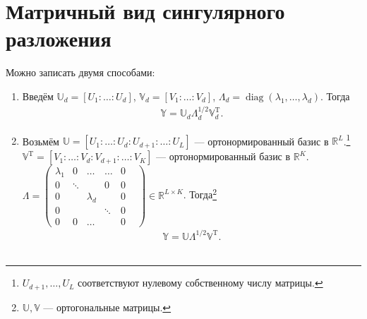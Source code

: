 \documentclass[specialist, 12pt,
subf, %
href, colorlinks=true,
substylefile = spbu.rtx,
]{disser}
\DeclareMathOperator{\diag}{diag}
\begin{document}
\section{Матричный вид сингулярного разложения}
Можно записать двумя способами:
\begin{enumerate}
	\item Введём $\mathbb{U}_d = [U_1: \ldots: U_d]$, $\mathbb{V}_d = [V_1: \ldots: V_d]$, $\Lambda_d = \diag(\lambda_1, \ldots, \lambda_d)$. Тогда
	\begin{gather*}
	\mathbb{Y} = \mathbb{U}_d\Lambda_d^{1/2}\mathbb{V}_d^{\mathrm{T}}.
	\end{gather*}
	\item Возьмём $\mathbb{U} = [U_1: \ldots: U_d: U_{d+1}: \ldots: U_L]$ --- ортонормированный базис в $\mathbb{R}^L$.\footnote{$U_{d+1}, \ldots, U_L$ соответствуют нулевому собственному числу матрицы.}\\
	$\mathbb{V}^\mathrm{T} = [V_1: \ldots: V_d: V_{d+1}: \ldots: V_K]$ --- ортонормированный базис в $\mathbb{R}^K$.\\
	$\Lambda = \begin{pmatrix}
	\lambda_1 & 0 & \ldots & \ldots & 0\\
	0 & \ddots & & 0 & 0\\
	0 & & \lambda_d & & 0&\\
	0 & & & \ddots & 0\\
	0 & 0 & \ldots & & 0 &
	\end{pmatrix} \in \mathbb{R}^{L \times K}$. Тогда\footnote{$\mathbb{U}, \mathbb{V}$ --- ортогональные матрицы.}
	\begin{gather*}
	\mathbb{Y} = \mathbb{U} \Lambda^{1/2} \mathbb{V}^{\mathrm{T}}.
	\end{gather*}
	~\\
\end{enumerate}

\end{document}
